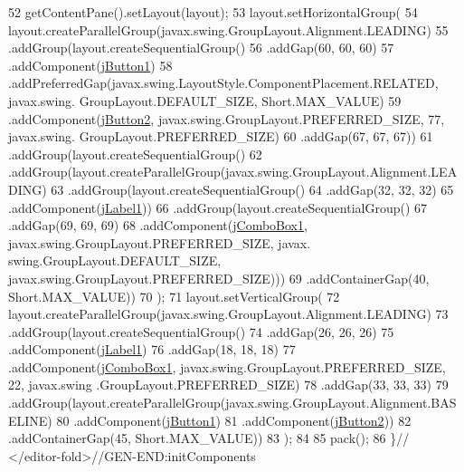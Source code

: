 \begin{DoxyCode}
52         getContentPane().setLayout(layout);
53         layout.setHorizontalGroup(
54             layout.createParallelGroup(javax.swing.GroupLayout.Alignment.LEADING)
55             .addGroup(layout.createSequentialGroup()
56                 .addGap(60, 60, 60)
57                 .addComponent(\mbox{\hyperlink{classsoftware_1_1parasoftware4_a0c714f857c09b57977dcab3d49056a17}{jButton1}})
58                 .addPreferredGap(javax.swing.LayoutStyle.ComponentPlacement.RELATED, javax.swing.
      GroupLayout.DEFAULT\_SIZE, Short.MAX\_VALUE)
59                 .addComponent(\mbox{\hyperlink{classsoftware_1_1parasoftware4_aefe98fde668b50160e97144d76536de8}{jButton2}}, javax.swing.GroupLayout.PREFERRED\_SIZE, 77, javax.swing.
      GroupLayout.PREFERRED\_SIZE)
60                 .addGap(67, 67, 67))
61             .addGroup(layout.createSequentialGroup()
62                 .addGroup(layout.createParallelGroup(javax.swing.GroupLayout.Alignment.LEADING)
63                     .addGroup(layout.createSequentialGroup()
64                         .addGap(32, 32, 32)
65                         .addComponent(\mbox{\hyperlink{classsoftware_1_1parasoftware4_a5298ea7ec05625113d0f4c0bfcd0c801}{jLabel1}}))
66                     .addGroup(layout.createSequentialGroup()
67                         .addGap(69, 69, 69)
68                         .addComponent(\mbox{\hyperlink{classsoftware_1_1parasoftware4_a0573e3c63f0f22f99ad45722e4575431}{jComboBox1}}, javax.swing.GroupLayout.PREFERRED\_SIZE, javax.
      swing.GroupLayout.DEFAULT\_SIZE, javax.swing.GroupLayout.PREFERRED\_SIZE)))
69                 .addContainerGap(40, Short.MAX\_VALUE))
70         );
71         layout.setVerticalGroup(
72             layout.createParallelGroup(javax.swing.GroupLayout.Alignment.LEADING)
73             .addGroup(layout.createSequentialGroup()
74                 .addGap(26, 26, 26)
75                 .addComponent(\mbox{\hyperlink{classsoftware_1_1parasoftware4_a5298ea7ec05625113d0f4c0bfcd0c801}{jLabel1}})
76                 .addGap(18, 18, 18)
77                 .addComponent(\mbox{\hyperlink{classsoftware_1_1parasoftware4_a0573e3c63f0f22f99ad45722e4575431}{jComboBox1}}, javax.swing.GroupLayout.PREFERRED\_SIZE, 22, javax.swing
      .GroupLayout.PREFERRED\_SIZE)
78                 .addGap(33, 33, 33)
79                 .addGroup(layout.createParallelGroup(javax.swing.GroupLayout.Alignment.BASELINE)
80                     .addComponent(\mbox{\hyperlink{classsoftware_1_1parasoftware4_a0c714f857c09b57977dcab3d49056a17}{jButton1}})
81                     .addComponent(\mbox{\hyperlink{classsoftware_1_1parasoftware4_aefe98fde668b50160e97144d76536de8}{jButton2}}))
82                 .addContainerGap(45, Short.MAX\_VALUE))
83         );
84 
85         pack();
86     \}\textcolor{comment}{// </editor-fold>//GEN-END:initComponents}
\end{DoxyCode}
\mbox{\label{classsoftware_1_1parasoftware4_afcfd8a8b7284cb03ceb13bee312f4648}} 
